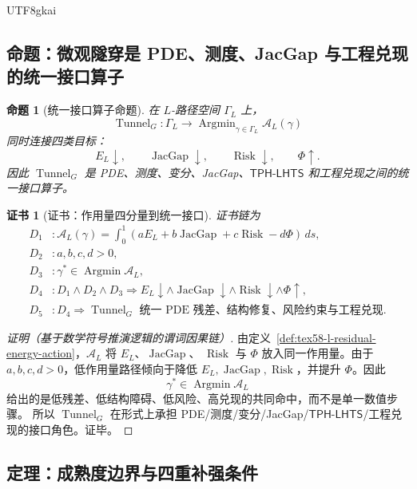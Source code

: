 \documentclass[12pt]{article}
\newtheorem{proposition}{命题}[section]
\newtheorem{Certificate}{证书}[section]
\newcommand{\TPHLHTS}{\ensuremath{\mathsf{TPH\mbox{-}LHTS}}}
\DeclareMathOperator{\JacGap}{JacGap}
\DeclareMathOperator{\Risk}{Risk}
\DeclareMathOperator{\Tunnel}{Tunnel}
\DeclareMathOperator*{\Argmin}{Argmin}
\begin{document}
\begin{CJK*}{UTF8}{gkai}
\subsection[命题：微观隧穿统一接口算子]{命题：微观隧穿是 PDE、测度、JacGap 与工程兑现的统一接口算子}
\label{subsec:tex58-unified-interface-proposition}

\begin{proposition}[统一接口算子命题]
\label{prop:tex58-unified-interface-operator}
在 \(L\)-路径空间 \(\Gamma_L\) 上，
\[
  \Tunnel_G:\Gamma_L\to\Argmin_{\gamma\in\Gamma_L}\mathcal A_L(\gamma)
\]
同时连接四类目标：
\[
  E_L\downarrow,
  \qquad
  \JacGap\downarrow,
  \qquad
  \Risk\downarrow,
  \qquad
  \Phi\uparrow.
\]
因此 \(\Tunnel_G\) 是 PDE、测度、变分、JacGap、\TPHLHTS{} 和工程兑现之间的统一接口算子。
\end{proposition}

\begin{Certificate}[证书：作用量四分量到统一接口]
\label{cert:tex58-unified-interface-operator}
证书链为
\[
\begin{aligned}
  D_1 &: \mathcal A_L(\gamma)
  =
  \int_0^1(aE_L+b\JacGap+c\Risk-d\Phi)\,ds,\\
  D_2 &: a,b,c,d>0,\\
  D_3 &: \gamma^\ast\in\Argmin\mathcal A_L,\\
  D_4 &: D_1\wedge D_2\wedge D_3
  \Rightarrow
  E_L\downarrow\wedge\JacGap\downarrow\wedge\Risk\downarrow\wedge\Phi\uparrow,\\
  D_5 &: D_4\Rightarrow
  \Tunnel_G\text{ 统一 PDE 残差、结构修复、风险约束与工程兑现}.
\end{aligned}
\]
\end{Certificate}

\begin{proof}[证明（基于数学符号推演逻辑的谓词因果链）]
由定义~\ref{def:tex58-l-residual-energy-action}，\(\mathcal A_L\) 将 \(E_L\)、\(\JacGap\)、
\(\Risk\) 与 \(\Phi\) 放入同一作用量。由于 \(a,b,c,d>0\)，低作用量路径倾向于降低
\(E_L,\JacGap,\Risk\)，并提升 \(\Phi\)。因此
\[
  \gamma^\ast\in\Argmin\mathcal A_L
\]
给出的是低残差、低结构障碍、低风险、高兑现的共同命中，而不是单一数值步骤。
所以 \(\Tunnel_G\) 在形式上承担 PDE/测度/变分/JacGap/\TPHLHTS{}/工程兑现的接口角色。证毕。
\end{proof}

\subsection{定理：成熟度边界与四重补强条件}
\label{subsec:tex58-maturity-boundary-theorem}


\end{CJK*}
\end{document}
